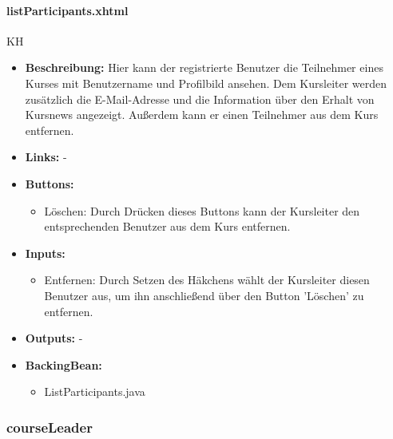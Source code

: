 				\paragraph{listParticipants.xhtml}
					KH\\
					\begin{itemize}
						\item \textbf{Beschreibung:} Hier kann der registrierte Benutzer die Teilnehmer eines Kurses mit Benutzername und Profilbild ansehen. Dem Kursleiter werden zusätzlich die E-Mail-Adresse und die Information über den Erhalt von Kursnews angezeigt. Außerdem kann er einen Teilnehmer aus dem Kurs entfernen.
						\item \textbf{Links:} -
						\item \textbf{Buttons:}
							\begin{itemize}
								\item Löschen: Durch Drücken dieses Buttons kann der Kursleiter den entsprechenden Benutzer aus dem Kurs entfernen.
							\end{itemize}
						\item \textbf{Inputs:}
							 \begin{itemize}
							 	\item Entfernen: Durch Setzen des Häkchens wählt der Kursleiter diesen Benutzer aus, um ihn anschließend über den Button 'Löschen' zu entfernen.
							 \end{itemize}
						\item \textbf{Outputs:} -
						\item \textbf{BackingBean:}
							\begin{itemize}
								\item ListParticipants.java
							\end{itemize}
					\end{itemize}
			
			\subsubsection{courseLeader}
			
